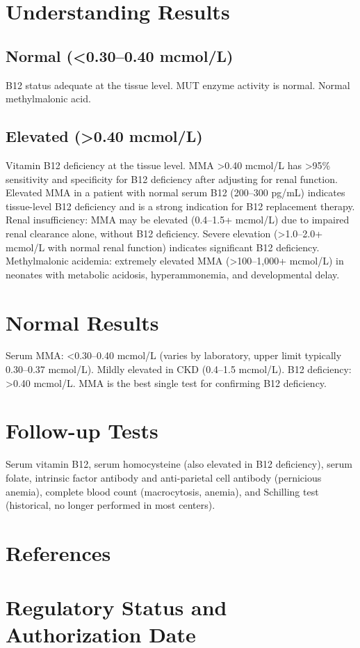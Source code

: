 \section*{Understanding Results}
\subsection*{Normal (<0.30--0.40 mcmol/L)}
B12 status adequate at the tissue level. MUT enzyme activity is normal. Normal methylmalonic acid.
\subsection*{Elevated (>0.40 mcmol/L)}
Vitamin B12 deficiency at the tissue level. MMA >0.40 mcmol/L has >95\% sensitivity and specificity for B12 deficiency after adjusting for renal function. Elevated MMA in a patient with normal serum B12 (200--300 pg/mL) indicates tissue-level B12 deficiency and is a strong indication for B12 replacement therapy. Renal insufficiency: MMA may be elevated (0.4--1.5+ mcmol/L) due to impaired renal clearance alone, without B12 deficiency. Severe elevation (>1.0--2.0+ mcmol/L with normal renal function) indicates significant B12 deficiency. Methylmalonic acidemia: extremely elevated MMA (>100--1,000+ mcmol/L) in neonates with metabolic acidosis, hyperammonemia, and developmental delay.
\section*{Normal Results}
Serum MMA: <0.30--0.40 mcmol/L (varies by laboratory, upper limit typically 0.30--0.37 mcmol/L). Mildly elevated in CKD (0.4--1.5 mcmol/L). B12 deficiency: >0.40 mcmol/L. MMA is the best single test for confirming B12 deficiency.
\section*{Follow-up Tests}
Serum vitamin B12, serum homocysteine (also elevated in B12 deficiency), serum folate, intrinsic factor antibody and anti-parietal cell antibody (pernicious anemia), complete blood count (macrocytosis, anemia), and Schilling test (historical, no longer performed in most centers).
\section*{References}



\clearpage
\section*{Regulatory Status and Authorization Date}

\clearpage
